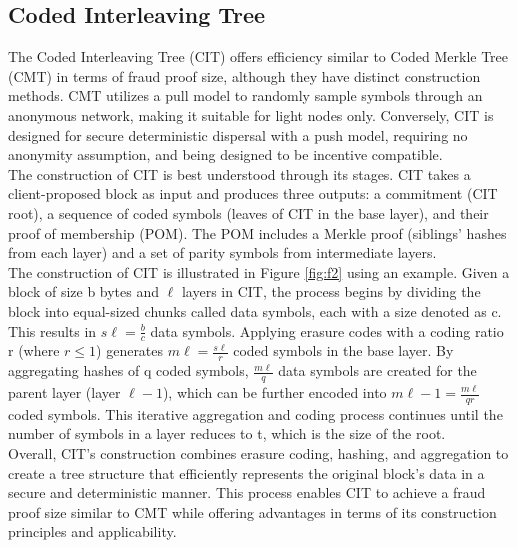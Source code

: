 \documentclass{report}
\begin{document}
\subsection{Coded Interleaving Tree}
The Coded Interleaving Tree (CIT) offers efficiency similar to Coded Merkle Tree (CMT) in terms of fraud proof size, although they have distinct construction methods. CMT utilizes a pull model to randomly sample symbols through an anonymous network, making it suitable for light nodes only. Conversely, CIT is designed for secure deterministic dispersal with a push model, requiring no anonymity assumption, and being designed to be incentive compatible.\\
The construction of CIT is best understood through its stages. CIT takes a client-proposed block as input and produces three outputs: a commitment (CIT root), a sequence of coded symbols (leaves of CIT in the base layer), and their proof of membership (POM). The POM includes a Merkle proof (siblings' hashes from each layer) and a set of parity symbols from intermediate layers.\\
The construction of CIT is illustrated in Figure \ref{fig:f2} using an example. Given a block of size b bytes and $\ell$ layers in CIT, the process begins by dividing the block into equal-sized chunks called data symbols, each with a size denoted as c. This results in $s\ell = \frac{b}{c}$ data symbols. Applying erasure codes with a coding ratio r (where $r \leq 1$) generates $m\ell = \frac{s\ell}{r}$ coded symbols in the base layer. By aggregating hashes of q coded symbols, $\frac{m\ell}{q}$ data symbols are created for the parent layer (layer $\ell - 1$), which can be further encoded into $m\ell - 1 = \frac{m\ell}{qr}$ coded symbols. This iterative aggregation and coding process continues until the number of symbols in a layer reduces to t, which is the size of the root.\\
Overall, CIT's construction combines erasure coding, hashing, and aggregation to create a tree structure that efficiently represents the original block's data in a secure and deterministic manner. This process enables CIT to achieve a fraud proof size similar to CMT while offering advantages in terms of its construction principles and applicability.
\end{document}
